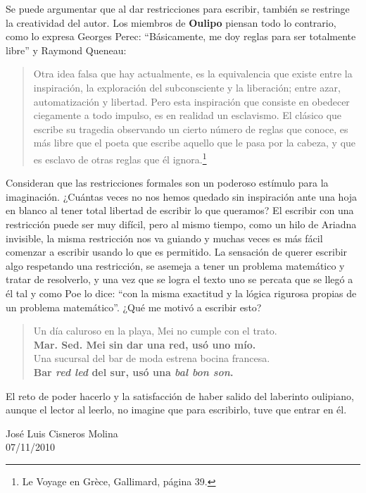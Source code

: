 \documentclass[12pt]{article}
\theoremstyle{definition}
\begin{document}
Se puede argumentar que al dar restricciones para escribir, también se restringe 
la creatividad del autor. Los miembros de \textbf{Oulipo} piensan todo lo 
contrario, como lo expresa Georges Perec: ``Básicamente, me doy reglas para ser 
totalmente libre'' y Raymond Queneau:
\begin{quote}
 Otra idea falsa que hay actualmente, es la equivalencia que existe entre la 
inspiración, la exploración del subconsciente y la liberación; entre azar, 
automatización y libertad. Pero esta inspiración que consiste en obedecer 
ciegamente a todo impulso, es en realidad un esclavismo. El clásico que escribe 
su tragedia observando un cierto número de reglas que conoce, es más libre que 
el poeta que escribe aquello que le pasa por la cabeza, y que es esclavo de 
otras reglas que él ignora.\footnote{Le Voyage en Grèce, Gallimard, página 39.}
\end{quote}
Consideran que las restricciones formales son un poderoso estímulo para la 
imaginación. ¿Cuántas veces no nos hemos quedado sin inspiración ante una hoja 
en blanco al tener total libertad de escribir lo que queramos? El escribir con 
una restricción puede ser muy difícil, pero al mismo tiempo, como un hilo de 
Ariadna invisible, la misma restricción nos va guiando y muchas veces es más 
fácil comenzar a escribir usando lo que es permitido. La sensación de querer 
escribir algo respetando una restricción, se asemeja a tener un problema 
matemático y tratar de resolverlo, y una vez que se logra el texto uno se 
percata que se llegó a él tal y como Poe lo dice: ``con la misma exactitud y la 
lógica rigurosa propias de un problema matemático''. ¿Qué me motivó a escribir 
esto?

\begin{quotation}%
\noindent Un día caluroso en la playa, Mei no cumple con el trato.\\
\textbf{Mar. Sed. Mei sin dar una red, usó uno mío.}\\[12pt]
Una sucursal del bar de moda estrena bocina francesa.\\
\textbf{Bar \textit{red led} del sur, usó una \textit{bal bon son}.}
\end{quotation}
El reto de poder hacerlo y la satisfacción de haber salido del laberinto 
oulipiano, aunque el lector al leerlo, no imagine que para escribirlo, tuve que 
entrar en él.



\begin{flushright}
 José Luis Cisneros Molina\\
07/11/2010
\end{flushright}
\end{document}
